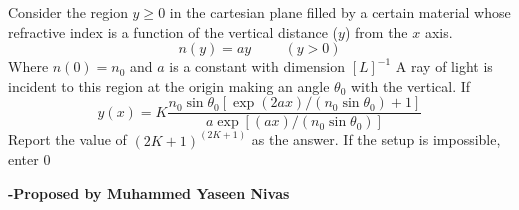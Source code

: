 \documentclass[11pt,a4paper]{scrartcl}
\begin{document}
\vspace{10mm}%
\begin{problem}

Consider the region $y\ge 0$ in the cartesian plane filled by a certain material whose refractive index  is a function of the vertical distance ($y$) from the $x$ axis.
\begin{equation*}
n(y)=ay \hspace{1cm} (y>0)
\end{equation*}
Where $n(0)=n_0$ and $a$ is a constant with dimension $[L]^{-1}$
A ray of light is incident to this region at the origin making an angle $\theta_0$ with the vertical.
If 
$$y(x)=K\frac{n_0\sin\theta_0
[\exp{(2ax)/(n_0\sin\theta_0)}+1]}{a\exp[(ax)/(n_0\sin\theta_0)]}$$
Report the value of $(2K+1)^{(2K+1)}$ as the answer.
If the setup is impossible, enter 0
\end{problem}
\begin{flushright}
\textbf{\Large{-Proposed by Muhammed Yaseen Nivas}}
\end{flushright}
\end{document}
